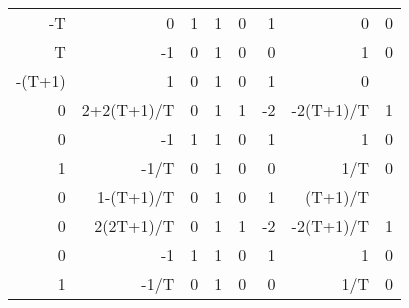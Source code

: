 \begin{table}[ht]
\begin{tabular}{rrrlrrrr}
        -T     & 0          & 1  & 1  & 0                                                          & 1                                                          & 0                                                          & 0         \\
        T      & -1         & 0  & 1  & 0                                                          & 0                                                          & 1                                                          & 0         \\
        -(T+1) & 1          & 0  & 1  & 0                                                          & 1                                                          & 0                                                          &           \\ \hline
        0      & 2+2(T+1)/T & 0  & 1  & 1                                                          & -2                                                         & -2(T+1)/T                                                  & 1         \\ \hline
        0      & -1         & 1  & 1  & 0                                                          & 1                                                          & 1                                                          & 0         \\
        1      & -1/T       & 0  & 1  & 0                                                          & 0                                                          & 1/T                                                        & 0         \\
        0      & 1-(T+1)/T  & 0  & 1  & 0                                                          & 1                                                          & (T+1)/T                                                    &           \\ \hline
        0      & 2(2T+1)/T  & 0  & 1  & 1                                                          & -2                                                         & -2(T+1)/T                                                  & 1         \\ \hline
        0      & -1         & 1  & 1  & 0                                                          & 1                                                          & 1                                                          & 0         \\
        1      & -1/T       & 0  & 1  & 0                                                          & 0                                                          & 1/T                                                        & 0         \\

\end{tabular}
\end{table}
